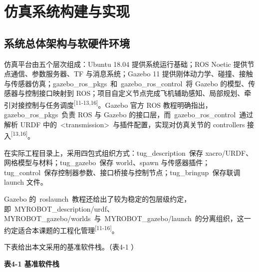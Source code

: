 \section{仿真系统构建与实现}

\subsection{系统总体架构与软硬件环境}

仿真平台由五个层次组成：Ubuntu 18.04 提供系统运行基础；ROS Noetic
提供节点通信、参数服务器、TF 与消息系统；Gazebo 11
提供刚体动力学、碰撞、接触与传感器仿真；gazebo\_ros\_pkgs~和~gazebo\_ros\_control~将
Gazebo 的模型、传感器与控制接口映射到
ROS；项目自定义节点完成飞机辅助感知、局部规划、牵引对接控制与任务调度\textsuperscript{[11-13,16]}。Gazebo
官方 ROS 教程明确指出，gazebo\_ros\_pkgs~负责 ROS 与 Gazebo
的接口层，而~gazebo\_ros\_control~通过解析 URDF
中的~\textless transmission\textgreater~与插件配置，实现对仿真关节的
controllers 接入\textsuperscript{[13,16]}。

在实际工程目录上，采用四包式组织方式：tug\_description~保存
xacro/URDF、网格模型与材料；tug\_gazebo~保存 world、spawn
与传感器插件；tug\_control~保存控制器参数、接口桥接与控制节点；tug\_bringup~保存联调
launch 文件。

Gazebo
的~roslaunch~教程还给出了较为稳定的包层级约定，即~MYROBOT\_description/urdf、MYROBOT\_gazebo/worlds~与~MYROBOT\_gazebo/launch~的分离组织，这一约定适合本课题的工程化管理\textsuperscript{[11-16]}。

下表给出本文采用的基准软件栈。（表4-1 ）

\textbf{表4-1 基准软件栈}

